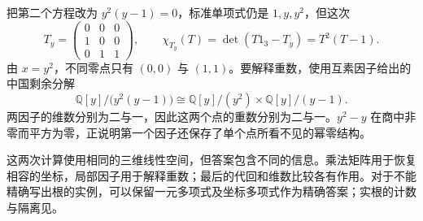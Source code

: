 \ProseParagraphBreak
把第二个方程改为 \(y^2(y-1)=0\)，标准单项式仍是 \(1,y,y^2\)，但这次
\[
	T_y=\begin{pmatrix}0&0&0\\1&0&0\\0&1&1\end{pmatrix},
	\qquad \chi_{T_y}(T)=\det(T1_3-T_y)=T^2(T-1).
\]
由 \(x=y^2\)，不同零点只有 \((0,0)\) 与 \((1,1)\)。要解释重数，使用互素因子给出的中国剩余分解
\[
	\mathbb Q[y]/\bigl(y^2(y-1)\bigr) \cong \mathbb Q[y]/(y^2)\times\mathbb Q[y]/(y-1).
\]
两因子的维数分别为二与一，因此这两个点的重数分别为二与一。\(y^2-y\) 在商中非零而平方为零，正说明第一个因子还保存了单个点所看不见的幂零结构。

\ProseParagraphBreak
这两次计算使用相同的三维线性空间，但答案包含不同的信息。乘法矩阵用于恢复相容的坐标，局部因子用于解释重数；最后的代回和维数比较各有作用。对于不能精确写出根的实例，可以保留一元多项式及坐标多项式作为精确答案；实根的计数与隔离见。
